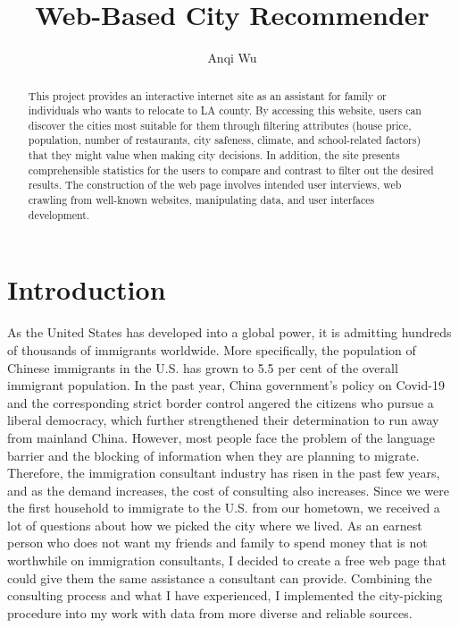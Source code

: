 \documentclass[10pt,twocolumn]{article}
\title{Web-Based City Recommender}
\author{Anqi Wu}
\affiliation{Occidental College}
\begin{document}
\maketitle
\begin{abstract}
        
 This project provides an interactive internet site as an assistant for family or individuals who wants to relocate to LA county. By accessing this website, users can discover the cities most suitable for them through filtering attributes (house price, population, number of restaurants, city safeness, climate, and school-related factors) that they might value when making city decisions. In addition, the site presents comprehensible statistics for the users to compare and contrast to filter out the desired results. The construction of the web page involves intended user interviews, web crawling from well-known websites, manipulating data, and user interfaces development.
        
\end{abstract}
\section{Introduction}
 
 As the United States has developed into a global power, it is admitting hundreds of thousands of immigrants worldwide. More specifically, the population of Chinese immigrants in the U.S. has grown to 5.5 per cent of the overall immigrant population. In the past year, China government's policy on Covid-19 and the corresponding strict border control angered the citizens who pursue a liberal democracy, which further strengthened their determination to run away from mainland China. However, most people face the problem of the language barrier and the blocking of information when they are planning to migrate. Therefore, the immigration consultant industry has risen in the past few years, and as the demand increases, the cost of consulting also increases.
\newline
\indent
Since we were the first household to immigrate to the U.S. from our hometown, we received a lot of questions about how we picked the city where we lived. As an earnest person who does not want my friends and family to spend money that is not worthwhile on immigration consultants, I decided to create a free web page that could give them the same assistance a consultant can provide. Combining the consulting process and what I have experienced, I implemented the city-picking procedure into my work with data from more diverse and reliable sources.
\end{document}
